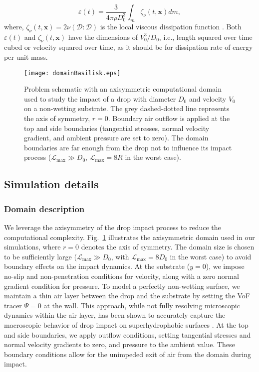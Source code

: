 \documentclass[reprint,amssymb,superscriptaddress,aps,prfluids,onecolumn]{revtex4-1}
\begin{document}
\begin{equation}
	\varepsilon(t) = \frac{3}{4\pi \rho D_0^3}\int_m\zeta_\nu(t, \boldsymbol{x}) dm,
	\label{Eqn::dissipation1}
\end{equation}
where, $\zeta_\nu(t, \boldsymbol{x}) = 2\nu \left(\boldsymbol{\mathcal{D}:\mathcal{D}}\right)$  is the local viscous dissipation function \cite{landau2013course}. Both $\varepsilon(t)$ and $\zeta_\nu(t, \boldsymbol{x})$ have the dimensions of $V_0^3/D_0$, i.e., length squared over time cubed or velocity squared over time, as it should be for dissipation rate of energy per unit mass.

\begin{figure}
	\centering
	\texttt{[image: domainBasilisk.eps]}
	\caption{Problem schematic with an axisymmetric computational domain used to study the impact of a drop with diameter $D_0$ and velocity $V_0$ on a non-wetting substrate. The grey dashed-dotted line represents the axis of symmetry, $r = 0$. Boundary air outflow is applied at the top and side boundaries (tangential stresses, normal velocity gradient, and ambient pressure are set to zero). The domain boundaries are far enough from the drop not to influence its impact process ($\mathcal{L}_\text{max} \gg D_0$, $\mathcal{L}_\text{max} = 8R$ in the worst case).}
	\label{fig:S1}
\end{figure}

\subsection{Simulation details}
\subsubsection{Domain description}
We leverage the axisymmetry of the drop impact process to reduce the computational complexity. Fig.~\ref{fig:S1} illustrates the axisymmetric domain used in our simulations, where $r=0$ denotes the axis of symmetry. The domain size is chosen to be sufficiently large ($\mathcal{L}_\text{max} \gg D_0$, with $\mathcal{L}_\text{max} = 8D_0$ in the worst case) to avoid boundary effects on the impact dynamics.
At the substrate ($y=0$), we impose no-slip and non-penetration conditions for velocity, along with a zero normal gradient condition for pressure. To model a perfectly non-wetting surface, we maintain a thin air layer between the drop and the substrate by setting the VoF tracer $\Psi = 0$ at the wall. This approach, while not fully resolving microscopic dynamics within the air layer, has been shown to accurately capture the macroscopic behavior of drop impact on superhydrophobic surfaces \citep{ramirez2020lifting,sanjay2023drop,alventosa2023inertio,garcia2024skating}.
At the top and side boundaries, we apply outflow conditions, setting tangential stresses and normal velocity gradients to zero, and pressure to the ambient value. These boundary conditions allow for the unimpeded exit of air from the domain during impact.
\end{document}
